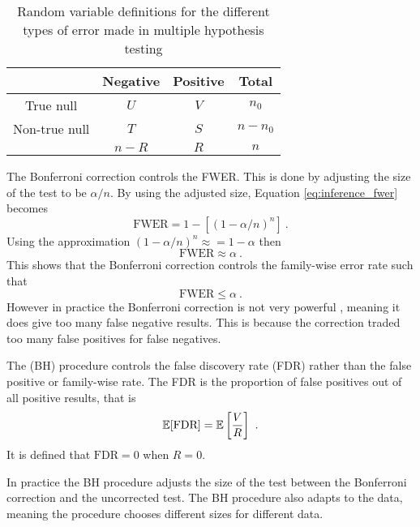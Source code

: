 \begin{table}
    \centering
    \begin{tabular}{c|c|c|c}
        &Negative&Positive&Total\\\hline
        True null & $U$ & $V$ & $n_0$\\
        Non-true null & $T$ & $S$ & $n-n_0$\\\hline
        &$n-R$&$R$&$n$
    \end{tabular}
    \caption{Random variable definitions for the different types of error made in multiple hypothesis testing}
    \label{table:inference_randomvariables}
\end{table}

The Bonferroni correction \citep{shaffer1995multiple, bland1995multiple, perneger1998what} controls the FWER. This is done by adjusting the size of the test to be $\alpha/n$. By using the adjusted size, Equation \eqref{eq:inference_fwer} becomes
\begin{equation}
    \text{FWER}=1-\left[(1-\alpha/n)^n\right]\ .
\end{equation}
Using the approximation $(1-\alpha/n)^n\approx = 1-\alpha$ then
\begin{equation}
    \text{FWER}\approx \alpha \ .
\end{equation}
This shows that the Bonferroni correction controls the family-wise error rate such that
\begin{equation}
    \text{FWER} \leqslant \alpha \ .
\end{equation}
However in practice the Bonferroni correction is not very powerful \citep{perneger1998what}, meaning it does give too many false negative results. This is because the correction traded too many false positives for false negatives.

The \cite{benjamini1995controlling} (BH) procedure controls the false discovery rate (FDR) \citep{benjamini2010discovering} rather than the false positive or family-wise rate. The FDR is the proportion of false positives out of all positive results, that is
\begin{equation}
    \operatorname{\mathbb{E}}[\text{FDR}] = \operatorname{\mathbb{E}}\left[
        \dfrac{V}{R}
    \right]
    \ .
\end{equation}
It is defined that $\text{FDR}=0$ when $R=0$.

In practice the BH procedure adjusts the size of the test between the Bonferroni correction and the uncorrected test. The BH procedure also adapts to the data, meaning the procedure chooses different sizes for different data.

